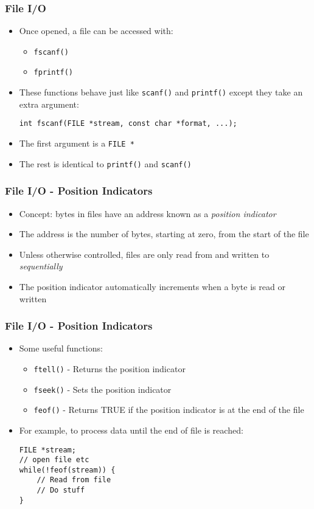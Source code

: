 \documentclass[14pt]{beamer}
\begin{document}
\begin{frame}[fragile]
\frametitle{File I/O}
\begin{itemize}
\item Once opened, a file can be accessed with:
	\begin{itemize}
		\item \texttt{fscanf()}
		\item \texttt{fprintf()}
	\end{itemize}
\item These functions behave just like \texttt{scanf()} and \texttt{printf()} except they take an extra argument:
\begin{lstlisting}[style=CStyle]
int fscanf(FILE *stream, const char *format, ...);
\end{lstlisting}
\item The first argument is a \texttt{FILE *}
\item The rest is identical to \texttt{printf()} and \texttt{scanf()}
\end{itemize}
\end{frame}

\begin{frame}
\frametitle{File I/O - Position Indicators}
\begin{itemize}
\item Concept: bytes in files have an address known as a \textit{position indicator}
\item The address is the number of bytes, starting at zero, from the start of the file
\item Unless otherwise controlled, files are only read from and written to \textit{sequentially}
\item The position indicator automatically increments when a byte is read or written
\end{itemize}
\end{frame}

\begin{frame}[fragile]
\frametitle{File I/O - Position Indicators}
\begin{itemize}
\item Some useful functions:
	\begin{itemize}
		\item \texttt{ftell()} - Returns the position indicator
		\item \texttt{fseek()} - Sets the position indicator
		\item \texttt{feof()} - Returns TRUE if the position indicator is at the end of the file
	\end{itemize}
\item For example, to process data until the end of file is reached:
\begin{lstlisting}[style=CStyle]
FILE *stream;
// open file etc
while(!feof(stream)) {
	// Read from file
	// Do stuff
}
\end{lstlisting}
\end{itemize}
\end{frame}
\end{document}
